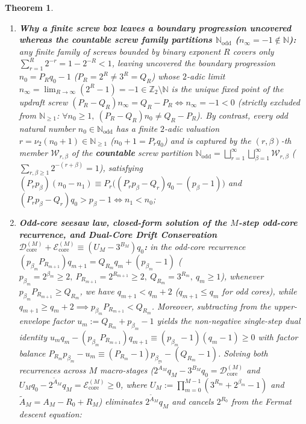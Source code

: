 \documentclass[11pt,a4paper]{article}
\newtheorem{theorem}{Theorem}[section]
\theoremstyle{definition}
\theoremstyle{remark}
\begin{document}
\begin{theorem}
\begin{enumerate}[label=\textbf{(\roman*)},leftmargin=*,noitemsep]
\[  \]
\item \textbf{Why a finite screw box leaves a boundary progression uncovered whereas the countable screw family partitions $\mathbb{N}_{\mathrm{odd}}$ ($n_\infty = -1 \notin \mathbb{N}$):}
  any finite family of screws bounded by binary exponent $R$ covers only $\sum_{r=1}^R 2^{-r} = 1 - 2^{-R} < 1$, leaving uncovered the boundary progression $n_0 = P_R q_0 - 1$ ($P_R = 2^R \ne 3^R = Q_R$) whose $2$-adic limit $n_\infty = \lim_{R\to\infty}(2^R - 1) = -1 \in \mathbb{Z}_2\setminus\mathbb{N}$ is the unique fixed point of the updraft screw $(P_R - Q_R)n_\infty = Q_R - P_R \iff n_\infty = -1 < 0$ (strictly excluded from $\mathbb{N}_{\ge 1}$: $\forall n_0 \ge 1,\ (P_R - Q_R)n_0 \ne Q_R - P_R$). By contrast, every odd natural number $n_0 \in \mathbb{N}_{\mathrm{odd}}$ has a finite $2$-adic valuation $r = \nu_2(n_0 + 1) \in \mathbb{N}_{\ge 1}$ ($n_0 + 1 = P_r q_0$) and is captured by the $(r,\beta)$-th member $\mathcal{W}_{r,\beta}$ of the \textbf{countable} screw partition $\mathbb{N}_{\mathrm{odd}} = \bigsqcup_{r=1}^\infty\bigsqcup_{\beta=1}^\infty \mathcal{W}_{r,\beta}$ ($\sum_{r,\beta\ge 1} 2^{-(r+\beta)} = 1$), satisfying $(P_r p_\beta)(n_0 - n_1) \equiv P_r\bigl((P_r p_\beta - Q_r)q_0 - (p_\beta - 1)\bigr)$ and $(P_r p_\beta - Q_r)q_0 > p_\beta - 1 \iff n_1 < n_0$;
\item \textbf{Odd-core seesaw law, closed-form solution of the $M$-step odd-core recurrence, and Dual-Core Drift Conservation $\mathcal{D}_{\mathrm{core}}^{(M)} + \mathcal{E}_{\mathrm{core}}^{(M)} \equiv (U_M - 3^{B_M})q_0$:}
  in the odd-core recurrence $(p_{\beta_m} P_{R_{m+1}}) q_{m+1} = Q_{R_m} q_m + (p_{\beta_m} - 1)$ ($p_{\beta_m} = 2^{\beta_m}\ge 2,\ P_{R_{m+1}} = 2^{R_{m+1}}\ge 2,\ Q_{R_m} = 3^{R_m},\ q_m\ge 1$), whenever $p_{\beta_m} P_{R_{m+1}} \ge Q_{R_m}$, we have $q_{m+1} < q_m + 2$ ($q_{m+1} \le q_m$ for odd cores), while $q_{m+1} \ge q_m + 2 \implies p_{\beta_m} P_{R_{m+1}} < Q_{R_m}$. Moreover, subtracting from the upper-envelope factor $u_m := Q_{R_m} + p_{\beta_m} - 1$ yields the non-negative single-step dual identity $u_m q_m - (p_{\beta_m} P_{R_{m+1}}) q_{m+1} \equiv (p_{\beta_m} - 1)(q_m - 1) \ge 0$ with factor balance $P_{R_m} p_{\beta_m} - u_m \equiv (P_{R_m} - 1)p_{\beta_m} - (Q_{R_m} - 1)$. Solving both recurrences across $M$ macro-stages ($2^{\widetilde{A}_M} q_M - 3^{B_M} q_0 = \mathcal{D}_{\mathrm{core}}^{(M)}$ and $U_M q_0 - 2^{\widetilde{A}_M} q_M = \mathcal{E}_{\mathrm{core}}^{(M)} \ge 0$, where $U_M := \prod_{m=0}^{M-1}(3^{R_m} + 2^{\beta_m} - 1)$ and $\widetilde{A}_M = A_M - R_0 + R_M$) eliminates $2^{\widetilde{A}_M} q_M$ and cancels $2^{R_0}$ from the Fermat descent equation:

\end{enumerate}
\end{theorem}
\end{document}
